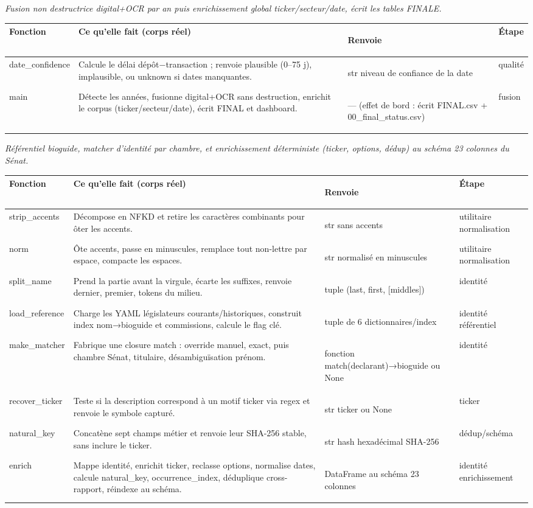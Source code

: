 \documentclass[11pt,a4paper]{article}
\makeatletter
\newenvironment{fnt}{%
  \par\footnotesize
  \setlength{\tabcolsep}{3pt}%
  \begin{longtable}{@{}>{\ttfamily\scriptsize\raggedright\arraybackslash}p{3.0cm} >{\raggedright\arraybackslash}p{7.5cm} >{\itshape\scriptsize\raggedright\arraybackslash}p{2.7cm} >{\scriptsize\raggedright\arraybackslash}p{1.85cm}@{}}
  \toprule
  \normalfont\bfseries\scriptsize Fonction & \bfseries\scriptsize Ce qu'elle fait (corps réel) &
  \normalfont\bfseries\scriptsize Renvoie & \normalfont\bfseries\scriptsize Étape\\
  \midrule\endhead
}{\bottomrule\end{longtable}\par}
\newcommand{\fnmod}[2]{\par\smallskip\noindent{\ttfamily\bfseries #1}\;\textmd{\itshape\small\textemdash{} #2}\par\nobreak\vspace{2pt}}
\makeatother
\begin{document}
\fnmod{fusion.py}{Fusion non destructrice digital+OCR par an puis enrichissement global ticker/secteur/date, écrit les tables FINALE.}
\begin{fnt}
date_\allowbreak confidence & Calcule le délai dépôt−transaction ; renvoie plausible (0–75 j)\allowbreak{},\allowbreak{} implausible,\allowbreak{} ou unknown si dates manquantes. & str niveau de confiance de la date & qualité \\
main & Détecte les années,\allowbreak{} fusionne digital+OCR sans destruction,\allowbreak{} enrichit le corpus (ticker/\allowbreak{}secteur/\allowbreak{}date)\allowbreak{},\allowbreak{} écrit FINAL et dashboard. & — (effet de bord : écrit FINAL.csv + 00_final_status.csv)\allowbreak{} & fusion \\
\end{fnt}
\fnmod{identity.py}{Référentiel bioguide, matcher d'identité par chambre, et enrichissement déterministe (ticker, options, dédup) au schéma 23 colonnes du Sénat.}
\begin{fnt}
strip_\allowbreak accents & Décompose en NFKD et retire les caractères combinants pour ôter les accents. & str sans accents & utilitaire normalisation \\
norm & Ôte accents,\allowbreak{} passe en minuscules,\allowbreak{} remplace tout non-lettre par espace,\allowbreak{} compacte les espaces. & str normalisé en minuscules & utilitaire normalisation \\
split_\allowbreak name & Prend la partie avant la virgule,\allowbreak{} écarte les suffixes,\allowbreak{} renvoie dernier,\allowbreak{} premier,\allowbreak{} tokens du milieu. & tuple (last,\allowbreak{} first,\allowbreak{} [middles]\allowbreak{})\allowbreak{} & identité \\
load_\allowbreak reference & Charge les YAML législateurs courants/\allowbreak{}historiques,\allowbreak{} construit index nom→\allowbreak{}bioguide et commissions,\allowbreak{} calcule le flag clé. & tuple de 6 dictionnaires/\allowbreak{}index & identité référentiel \\
make_\allowbreak matcher & Fabrique une closure match : override manuel,\allowbreak{} exact,\allowbreak{} puis chambre Sénat,\allowbreak{} titulaire,\allowbreak{} désambiguïsation prénom. & fonction match(declarant)\allowbreak{}→\allowbreak{}bioguide ou None & identité \\
recover_\allowbreak ticker & Teste si la description correspond à un motif ticker via regex et renvoie le symbole capturé. & str ticker ou None & ticker \\
natural_\allowbreak key & Concatène sept champs métier et renvoie leur SHA-256 stable,\allowbreak{} sans inclure le ticker. & str hash hexadécimal SHA-256 & dédup/schéma \\
enrich & Mappe identité,\allowbreak{} enrichit ticker,\allowbreak{} reclasse options,\allowbreak{} normalise dates,\allowbreak{} calcule natural_key,\allowbreak{} occurrence_index,\allowbreak{} déduplique cross-rapport,\allowbreak{} réindexe au schéma. & DataFrame au schéma 23 colonnes & identité enrichissement \\
\end{fnt}
\end{document}
